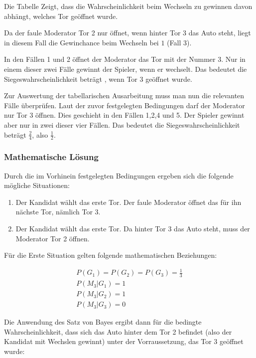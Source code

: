 Die Tabelle Zeigt, dass die Wahrscheinlichkeit beim Wechseln zu gewinnen davon abhängt, welches Tor geöffnet wurde.

Da der faule Moderator Tor 2 nur öffnet, wenn hinter Tor 3 das Auto steht, liegt in diesem Fall die Gewinchance beim Wechseln bei $1$ (Fall 3).

In den Fällen 1 und 2 öffnet der Moderator das Tor mit der Nummer 3. Nur in einem dieser zwei Fälle gewinnt der Spieler, wenn er wechselt. Das bedeutet die Siegeswahrscheinlichkeit beträgt , wenn Tor 3 geöffnet wurde.

Zur Auswertung der tabellarischen Ausarbeitung muss man nun die relevanten Fälle überprüfen. Laut der zuvor festgelegten Bedingungen darf der Moderator nur Tor 3 öffnen.
Dies geschieht in den Fällen 1,2,4 und 5. Der Spieler gewinnt aber nur in zwei dieser vier Fällen. Das bedeutet die Siegeswahrscheinlichkeit beträgt $\frac{2}{4}$,
also $\frac{1}{2}$.

\subsubsection{Mathematische Lösung}

Durch die im Vorhinein festgelegten Bedingungen ergeben sich die folgende mögliche Situationen:
\begin{enumerate}
    \item Der Kandidat wählt das erste Tor. Der faule Moderator öffnet das für ihn nächste Tor, nämlich Tor 3.
    \item Der Kandidat wählt das erste Tor. Da hinter Tor 3 das Auto steht, muss der Moderator Tor 2 öffnen.
\end{enumerate}

Für die Erste Situation gelten folgende mathematischen Beziehungen:

\begin{equation}
    \begin{split}
        P(G_1) = P(G_2) = P(G_3) = \frac{1}{3}\\
        P(M_3 | G_1) = 1 \\
        P(M_3 | G_2) = 1 \\
        P(M_3 | G_3) = 0
    \end{split}
\end{equation}

Die Anwendung des Satz von Bayes ergibt dann für die bedingte Wahrscheinlichkeit, dass sich das Auto hinter dem Tor 2 befindet (also der Kandidat mit Wechslen gewinnt) unter der Vorraussetzung, das Tor 3 geöffnet wurde:


